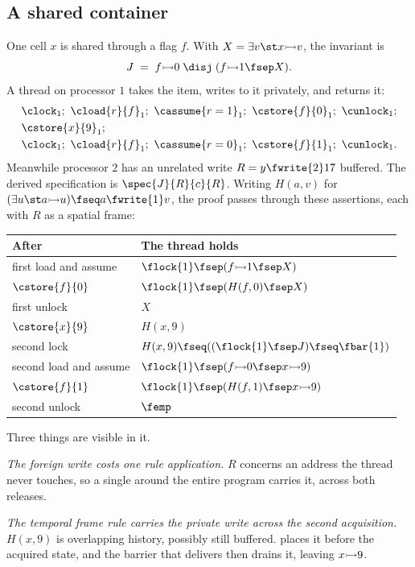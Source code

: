 \subsection{A shared container}

One cell $x$ is shared through a flag $f$. With
$X = \exists v \st x \fcell v$, the invariant is
\[
  J \;=\; f \fcell 0 \;\disj\; (f \fcell 1 \fsep X).
\]
A thread on processor $1$ takes the item, writes to it privately, and
returns it:
\begin{align*}
 & \clock_1;\ \cload{r}{f}_1;\ \cassume{r = 1}_1;\ \cstore{f}{0}_1;\
   \cunlock_1; \\
 & \cstore{x}{9}_1; \\
 & \clock_1;\ \cload{r}{f}_1;\ \cassume{r = 0}_1;\ \cstore{f}{1}_1;\
   \cunlock_1 .
\end{align*}
Meanwhile processor $2$ has an unrelated write $R = y \fwrite{2} 17$
buffered. The derived specification is
$\spec{J}{R}{c}{R}$. Writing
$H(a,v)$ for $(\exists u \st a \fcell u) \fseq a \fwrite{1} v$, the proof
passes through these assertions, each with $R$ as a spatial frame:
\begin{center}\small
\begin{tabular}{@{}ll@{}}
\toprule
After & The thread holds \\
\midrule
first load and assume & $\flock{1} \fsep (f \fcell 1 \fsep X)$ \\
$\cstore{f}{0}$ & $\flock{1} \fsep (H(f,0) \fsep X)$ \\
first unlock & $X$ \\
$\cstore{x}{9}$ & $H(x,9)$ \\
second lock & $H(x,9) \fseq ((\flock{1} \fsep J) \fseq \fbar{1})$ \\
second load and assume & $\flock{1} \fsep (f \fcell 0 \fsep x \fcell 9)$ \\
$\cstore{f}{1}$ & $\flock{1} \fsep (H(f,1) \fsep x \fcell 9)$ \\
second unlock & $\femp$ \\
\bottomrule
\end{tabular}
\end{center}
Three things are visible in it.

\emph{The foreign write costs one rule application.} $R$ concerns an
address the thread never touches, so a single  around the
entire program carries it, across both releases.

\emph{The temporal frame rule carries the private write across the second
acquisition.} $H(x,9)$ is overlapping history, possibly still buffered.
\rn{frame-tm} places it before the acquired state, and the barrier that
\rn{lock} delivers then drains it, leaving $x \operatorname{\!\rightarrowtail\!} 9$.

